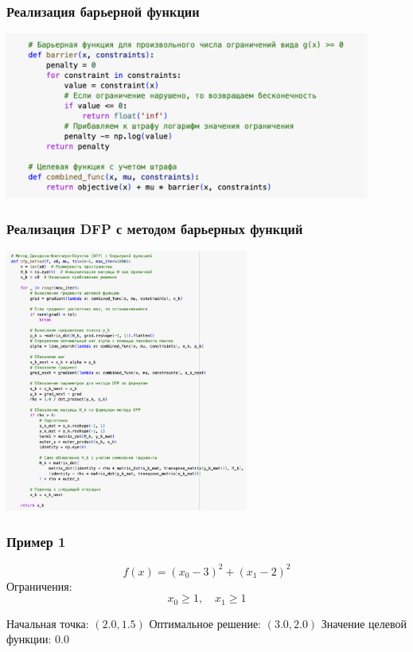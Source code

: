 \documentclass[12pt,pdf,hyperref={unicode}]{beamer}
\begin{document}
\begin{frame}
\frametitle{Реализация барьерной функции}
\begin{center}
    \includegraphics[width=0.9\textwidth]{image3.png}
\end{center}
\end{frame}

\begin{frame}
\frametitle{Реализация DFP с методом барьерных функций}
\begin{center}
    \includegraphics[width=0.6\textwidth]{image4.png}
\end{center}
\end{frame}

\begin{frame}
\frametitle{Пример 1}
\[
f(x) = (x_0 - 3)^2 + (x_1 - 2)^2
\]
Ограничения: \\
\[
x_0 \geq 1, \quad x_1 \geq 1
\]

Начальная точка: $(2.0, 1.5)$
Оптимальное решение: $(3.0, 2.0)$
Значение целевой функции: $0.0$
\end{frame}
\end{document}
